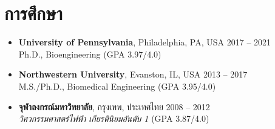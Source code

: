 \section{\sc การศึกษา}

\begin{itemize}[leftmargin=0cm, label={}]

\item {\bf University of Pennsylvania}, Philadelphia, PA, USA \hfill 2017 -- 2021 \\
Ph.D., Bioengineering \hfill (GPA 3.97/4.0)

\item {\bf Northwestern University}, Evanston, IL, USA \hfill 2013 -- 2017 \\
M.S./Ph.D., Biomedical Engineering \hfill (GPA 3.95/4.0)

\item {\bf จุฬาลงกรณ์มหาวิทยาลัย}, กรุงเทพ, ประเทศไทย \hfill 2008 -- 2012 \\
{\em วิศวกรรมศาสตร์ไฟฟ้า เกียรตินิยมอันดับ 1} \hfill (GPA 3.87/4.0)

\end{itemize}

